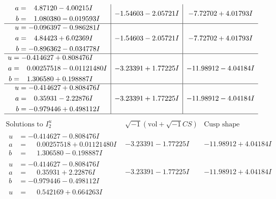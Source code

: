 \documentclass[1p]{elsarticle_modified}
\theoremstyle{definition}
\newcommand{\I}{\sqrt{-1}}
\begin{document}
$$\begin{array}{c|c|c}
\begin{aligned}
a &= \phantom{-}4.87120 - 4.00215 I \\
b &= \phantom{-}1.080380 - 0.019593 I\end{aligned}
 & -1.54603 - 2.05721 I & -7.72702 + 4.01793 I \\ \hline\begin{aligned}
u &= -0.096397 - 0.986281 I \\
a &= \phantom{-}4.84423 + 6.02369 I \\
b &= -0.896362 - 0.034778 I\end{aligned}
 & -1.54603 - 2.05721 I & -7.72702 + 4.01793 I \\ \hline\begin{aligned}
u &= -0.414627 + 0.808476 I \\
a &= \phantom{-}0.00257518 - 0.01121480 I \\
b &= \phantom{-}1.306580 + 0.198887 I\end{aligned}
 & -3.23391 + 1.77225 I & -11.98912 - 4.04184 I \\ \hline\begin{aligned}
u &= -0.414627 + 0.808476 I \\
a &= \phantom{-}0.35931 - 2.22876 I \\
b &= -0.979446 + 0.498112 I\end{aligned}
 & -3.23391 + 1.77225 I & -11.98912 - 4.04184 I\\
 \hline 
 \end{array}$$\newpage$$\begin{array}{c|c|c}  
\text{Solutions to }I^u_{2}& \I (\text{vol} + \sqrt{-1}CS) & \text{Cusp shape}\\
 \hline 
\begin{aligned}
u &= -0.414627 - 0.808476 I \\
a &= \phantom{-}0.00257518 + 0.01121480 I \\
b &= \phantom{-}1.306580 - 0.198887 I\end{aligned}
 & -3.23391 - 1.77225 I & -11.98912 + 4.04184 I \\ \hline\begin{aligned}
u &= -0.414627 - 0.808476 I \\
a &= \phantom{-}0.35931 + 2.22876 I \\
b &= -0.979446 - 0.498112 I\end{aligned}
 & -3.23391 - 1.77225 I & -11.98912 + 4.04184 I \\ \hline\begin{aligned}
u &= \phantom{-}0.542169 + 0.664263 I \\

\end{aligned}
\end{array}$$
\end{document}
